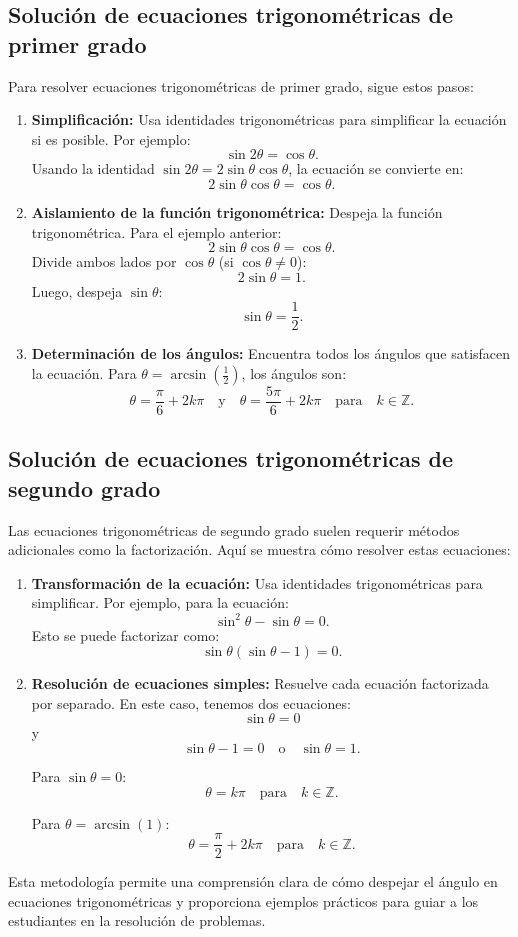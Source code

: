 \subsection{Solución de ecuaciones trigonométricas de primer grado}

Para resolver ecuaciones trigonométricas de primer grado, sigue estos pasos:

\begin{enumerate}
    \item \textbf{Simplificación:} Usa identidades trigonométricas para simplificar la ecuación si es posible. Por ejemplo:
    \[
    \sin 2\theta = \cos \theta.
    \]
    Usando la identidad \(\sin 2\theta = 2 \sin \theta \cos \theta\), la ecuación se convierte en:
    \[
    2 \sin \theta \cos \theta = \cos \theta.
    \]
    
    \item \textbf{Aislamiento de la función trigonométrica:} Despeja la función trigonométrica. Para el ejemplo anterior:
    \[
    2 \sin \theta \cos \theta = \cos \theta.
    \]
    Divide ambos lados por \(\cos \theta\) (si \(\cos \theta \neq 0\)):
    \[
    2 \sin \theta = 1.
    \]
    Luego, despeja \(\sin \theta\):
    \[
    \sin \theta = \frac{1}{2}.
    \]
    
    \item \textbf{Determinación de los ángulos:} Encuentra todos los ángulos que satisfacen la ecuación. Para \( \theta = \arcsin{\left(\frac{1}{2}\right)}\), los ángulos son:
    \[
    \theta = \frac{\pi}{6} + 2k\pi \quad \text{y} \quad \theta = \frac{5\pi}{6} + 2k\pi \quad \text{para} \quad k \in \mathbb{Z}.
    \]
\end{enumerate}

\subsection{Solución de ecuaciones trigonométricas de segundo grado}

Las ecuaciones trigonométricas de segundo grado suelen requerir métodos adicionales como la factorización. Aquí se muestra cómo resolver estas ecuaciones:

\begin{enumerate}
    \item \textbf{Transformación de la ecuación:} Usa identidades trigonométricas para simplificar. Por ejemplo, para la ecuación:
    \[
    \sin^2 \theta - \sin \theta = 0.
    \]
    Esto se puede factorizar como:
    \[
    \sin \theta (\sin \theta - 1) = 0.
    \]
    
    \item \textbf{Resolución de ecuaciones simples:} Resuelve cada ecuación factorizada por separado. En este caso, tenemos dos ecuaciones:
    \[
    \sin \theta = 0
    \]
    y
    \[
    \sin \theta - 1 = 0 \quad \text{o} \quad \sin \theta = 1.
    \]
    
    Para \(\sin \theta = 0\):
    \[
    \theta = k\pi \quad \text{para} \quad k \in \mathbb{Z}.
    \]
    
    Para \( \theta = \arcsin{(1)}\):
    \[
    \theta = \frac{\pi}{2} + 2k\pi \quad \text{para} \quad k \in \mathbb{Z}.
    \]
\end{enumerate}

Esta metodología permite una comprensión clara de cómo despejar el ángulo en ecuaciones trigonométricas y proporciona ejemplos prácticos para guiar a los estudiantes en la resolución de problemas.
